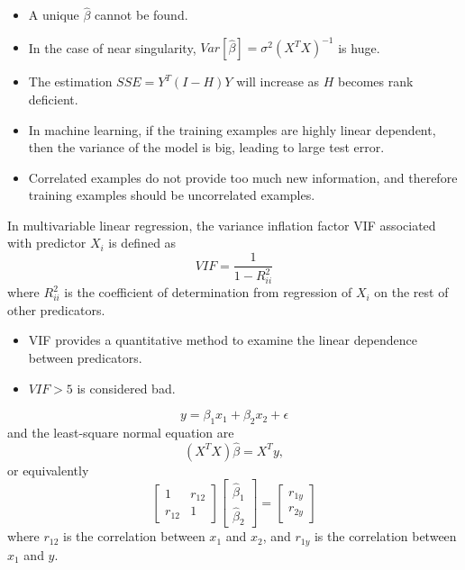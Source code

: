 \begin{refsection}
\begin{remark}\hfill
	\begin{itemize}
		\item A unique $\hat{\beta}$ cannot be found.
		\item In the case of near singularity, $Var[\hat{\beta}] = \sigma^2(X^TX)^{-1}$ is huge.
		\item The estimation $SSE = Y^T(I-H)Y$ will increase as $H$ becomes rank deficient.
	\end{itemize}
\end{remark}


\begin{remark}\hfill
	\begin{itemize}
		\item In machine learning, if the training examples are highly linear dependent, then the variance of the model is big, leading to large test error.
		\item Correlated examples do not provide too much new information, and therefore training examples should be uncorrelated examples. 
	\end{itemize}
\end{remark}


\begin{definition}\cite[335]{montgomery2012introduction}
	In multivariable linear regression, the variance inflation factor VIF associated with predictor $X_i$ is defined as
	$$VIF = \frac{1}{1-R_{ii}^2}$$
	where $R^2_{ii}$ is the coefficient of determination from regression of $X_i$ on the rest of other predicators.
\end{definition}

\begin{remark}[interpretation]\hfill
	\begin{itemize}
		\item VIF provides a quantitative method to examine the linear dependence between predicators.
		\item  $VIF > 5 $ is considered bad.
	\end{itemize}
	
\end{remark}



\begin{example}\cite[326]{montgomery2012introduction}
$$y = \beta_1 x_1 + \beta_2 x_2 + \epsilon$$
and the least-square normal equation are
$$(X^TX)\hat{\beta} = X^Ty,$$
or equivalently
$$\begin{bmatrix}
1 & r_{12} \\
r_{12} & 1
\end{bmatrix}\begin{bmatrix}
\hat{\beta}_1\\
\hat{\beta}_2
\end{bmatrix} = \begin{bmatrix}
r_{1y}\\
r_{2y}
\end{bmatrix}$$
where $r_{12}$ is the correlation between $x_1$ and $x_2$, and $r_{1y}$ is the correlation between $x_1$ and $y$. 


\end{example}
\end{refsection}
